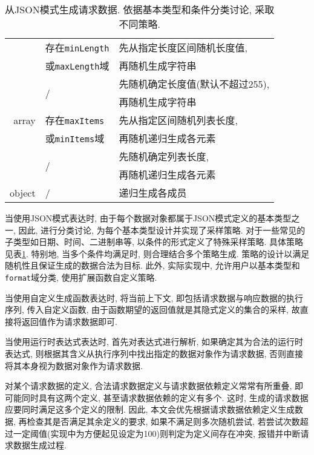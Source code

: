 \begin{table}[!htb]
\begin{tabular}{rll}
                & 存在\texttt{minLength} & 先从指定长度区间随机长度值, \\
                & 或\texttt{maxLength}域 & 再随机生成字符串 \\
                \cline{2-3}
                & \multirow{2}{*}{/} & 先随机确定长度值(默认不超过255),\\
                & & 再随机生成字符串 \\
                \hline
                array & 存在\texttt{maxItems} & 先从指定区间随机列表长度,\\
                & 或\texttt{minItems}域 & 再随机递归生成各元素 \\
                \cline{2-3}
                & \multirow{2}{*}{/} & 先随机确定列表长度,\\
                & & 再随机递归生成各元素 \\
                \hline
                object & / & 递归生成各成员 \\
                \bottomrule
            \end{tabular}
            \caption{从JSON模式生成请求数据. 依据基本类型和条件分类讨论, 采取不同策略.}
            \label{tab:schemagen}
        \end{table}
    
        当使用JSON模式表达时, 由于每个数据对象都属于JSON模式定义的基本类型之一, 因此, 进行分类讨论, 为每个基本类型设计并实现了采样策略. 对于一些常见的子类型如日期、时间、二进制串等, 以条件的形式定义了特殊采样策略. 具体策略见表\ref{tab:schemagen}. 特别地, 当多个条件均满足时, 则合理结合多个策略生成. 策略的设计以满足随机性且保证生成的数据合法为目标. 此外, 实际实现中, 允许用户以基本类型和\texttt{format}域分类, 使用扩展函数自定义策略.
        
        当使用自定义生成函数表达时, 将当前上下文, 即包括请求数据与响应数据的执行序列, 传入自定义函数, 由于函数期望的返回值就是其隐式定义的集合的采样, 故直接将返回值作为请求数据即可.
        
        当使用运行时表达式表达时, 首先对表达式进行解析, 如果确定其为合法的运行时表达式, 则根据其含义从执行序列中找出指定的数据对象作为请求数据, 否则直接将其本身视为数据对象作为请求数据.
        
        对某个请求数据的定义, 合法请求数据定义与请求数据依赖定义常常有所重叠, 即可能同时具有这两个定义, 甚至请求数据依赖的定义有多个. 这时, 生成的请求数据应要同时满足这多个定义的限制. 因此, 本文会优先根据请求数据依赖定义生成数据, 再检查其是否满足其余定义的要求, 如果不满足则多次随机尝试, 若尝试次数超过一定阈值(实现中为方便起见设定为100)则判定为定义间存在冲突, 报错并中断请求数据生成过程.
        

